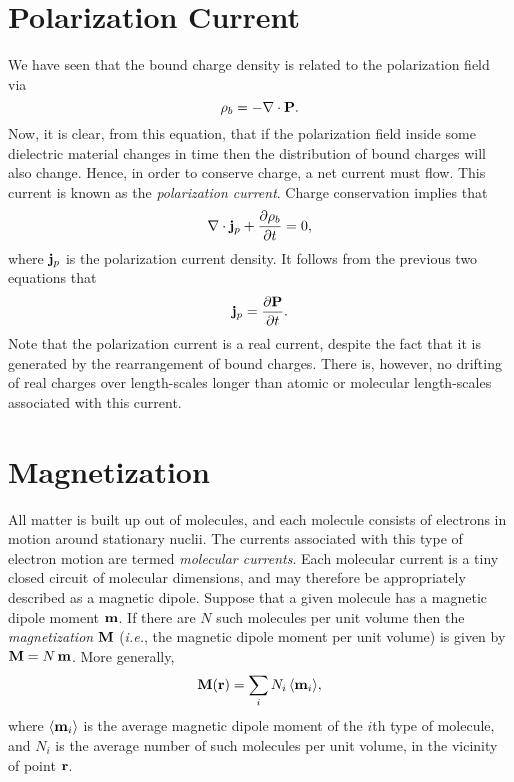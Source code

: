 \section{Polarization Current}
We have seen that the bound charge density is related to the polarization field
via
\begin{equation}
\rho_b = - \nabla\cdot{\bf P}.
\end{equation}
Now, it is clear, from this equation, that if the polarization field  inside
some dielectric material changes in time then the distribution of bound charges will
also change. Hence, in order to conserve charge, a net current must flow.
This current is known as the {\em polarization current}. Charge conservation
implies that
\begin{equation}
\nabla\cdot {\bf j}_p + \frac{\partial \rho_b}{\partial t} = 0,
\end{equation}
where ${\bf j}_p$ is the polarization current density. It follows from the previous two equations that
\begin{equation}\label{e6.44x}
{\bf j}_p = \frac{\partial {\bf P}}{\partial t}.
\end{equation}
Note that the polarization current is a real current, despite the fact that
it is generated by the rearrangement of bound charges. There is, however,
no drifting of real charges over length-scales longer than atomic or molecular
length-scales associated with this current.

\section{Magnetization}
All matter is built up out of  molecules, and each molecule consists of
electrons in motion around stationary nuclii. The currents
associated with this type of electron motion 
are termed {\em molecular currents}. Each molecular current is
a tiny closed circuit of molecular dimensions, and may therefore be 
appropriately described as a magnetic dipole. Suppose that a given
molecule has a magnetic dipole moment ${\bf m}$. 
If there are $N$ such  molecules per unit volume then the {\em magnetization}\/ ${\bf M}$
({\em i.e.}, the magnetic dipole moment per unit volume) is given
by ${\bf M} = N\, {\bf m}$. More generally,
\begin{equation}
{\bf M} ({\bf r}) = \sum_i N_i\, \langle {\bf m}_i\rangle,
\end{equation}
where $\langle {\bf m}_i\rangle$ is the average magnetic dipole moment
of the $i$th type of molecule,
and $N_i$ is the average number of such molecules per unit volume, in the vicinity of point ${\bf r}$. 

